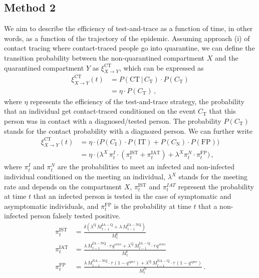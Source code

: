 \documentclass{article}
\begin{document}
\subsection{Method 2}
We aim to describe the efficiency of test-and-trace as a function of time, in other words, as a function of the trajectory of the epidemic. Assuming approach (i) of contact tracing where contact-traced people go into quarantine, we can define the transition probability between the non-quarantined compartment $X$ and the quarantined compartment $Y$ as $\xi_{X \to Y}^\mathrm{CT}$, which can be expressed as
\begin{align}
\xi_{X \to Y}^\mathrm{CT}(t) &= P(\mathrm{CT} \, | \,C_\mathrm{T}) \cdot P(C_\mathrm{T}) \nonumber \\
& = \eta \cdot P(C_\mathrm{T}) \, ,
\end{align}
where $\eta$ represents the efficiency of the test-and-trace strategy, the probability that an individual get contact-traced conditioned on the event $C_\mathrm{T}$ that this person was in contact with a diagnosed/tested person. The probability $P(C_\mathrm{T})$ stands for the contact probability with a diagnozed person. We can further write
\begin{align}
\xi_{X \to Y}^\mathrm{CT}(t) &= \eta \cdot \Big( P(C_\mathrm{I}) \cdot P(\mathrm{IT}) + P(C_\mathrm{N}) \cdot P(\mathrm{FP}) \Big)\nonumber \\
&= \eta \cdot \Big( \lambda^X \, \pi_t^I \cdot (\pi_t^\mathrm{IST} + \pi_t^\mathrm{IAT}) + \lambda^X \pi_t^N \cdot \pi_t^\mathrm{FP} \Big) \, ,
\end{align} 
where $\pi_t^I$ and $\pi_t^N$ are the probabilities to meet an infected and non-infected individual conditioned on the meeting an individual, $\lambda^X$ stands for the meeting rate and depends on the compartment $X$, $\pi_t^\mathrm{IST}$ and $\pi_t^{IAT}$ represent the probability at time $t$ that an infected person is tested in the case of  symptomatic and asymptomatic individuals, and $\pi_t^\mathrm{FP}$ is the probability at time $t$ that a non-infected person falsely tested positive. 
\begin{align}
\pi_t^\mathrm{IST} & = \frac{ \delta (\lambda^\mathrm{Q} \, M^\mathrm{IA-Q}_{t-1} + \lambda \, M^\mathrm{IA-NQ}_{t-1})}{M_t^\mathrm{I}} \nonumber \\
\pi_t^\mathrm{IAT} &= \frac{\lambda \, M_{t-1}^\mathrm{IA-NQ}\cdot \tau \,q^{sens} + \lambda^\mathrm{Q} \, M_{t-1}^\mathrm{IA-Q}\cdot \tau \,q^{sens}}{M_t^\mathrm{I}} \nonumber \\
\pi_t^\mathrm{FP} &= \frac{\lambda \, M_{t-1}^\mathrm{NA-NQ}\cdot \tau \,(1-q^{spec}) + \lambda^\mathrm{Q} \, M_{t-1}^\mathrm{NA-Q}\cdot \tau \,(1- q^{spec})}{M_t^\mathrm{N}} \, .
\end{align}
\end{document}
